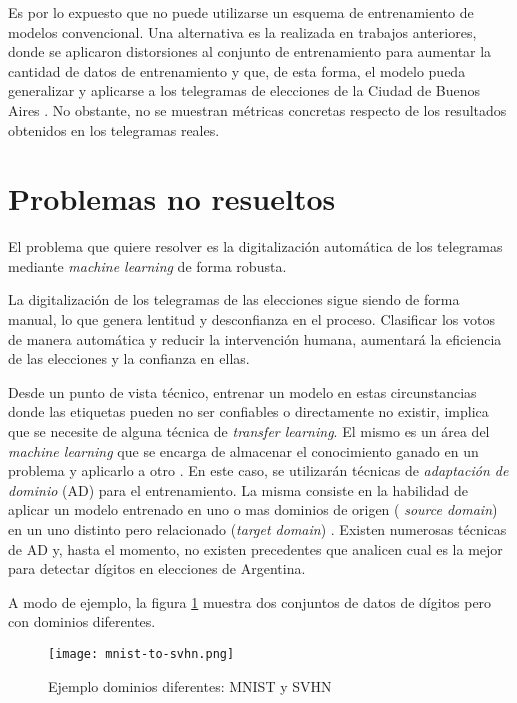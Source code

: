 \documentclass[a4paper, twoside, spanish]{report}
\begin{document}
Es por lo expuesto que no puede utilizarse un esquema de entrenamiento de modelos convencional. Una alternativa es la
realizada en trabajos anteriores, donde se aplicaron distorsiones al conjunto de entrenamiento para aumentar la
cantidad de datos de entrenamiento y que, de esta forma, el modelo pueda generalizar y aplicarse a los telegramas de
elecciones de la Ciudad de Buenos Aires \parencite{lamagna2016lectura}. No obstante, no se muestran m\'etricas concretas respecto de los resultados obtenidos en
los telegramas reales.

\section*{Problemas no resueltos}

El problema que quiere resolver es la digitalizaci\'on autom\'atica de los telegramas mediante {\it machine learning}
de forma robusta.

La digitalizaci\'on de los telegramas de las elecciones sigue siendo de forma manual, lo que genera lentitud y
desconfianza en el proceso. Clasificar los votos de manera autom\'atica y reducir la intervenci\'on humana, aumentar\'a
la eficiencia de las elecciones y la confianza en ellas.

Desde un punto de vista t\'ecnico, entrenar un modelo en estas circunstancias donde las etiquetas pueden no ser
confiables o directamente no existir, implica que se necesite de alguna t\'ecnica de {\it transfer learning}. El mismo
es un \'area del {\it machine learning} que se encarga de almacenar el conocimiento ganado en un problema y aplicarlo a
otro \parencite{thrun1998learning}. En este caso, se utilizar\'an t\'ecnicas de {\it adaptaci\'on de dominio} (AD) para el
entrenamiento. La misma consiste en la habilidad de aplicar un modelo entrenado en uno o mas dominios de origen ({\it
		source domain}) en un uno distinto pero relacionado ({\it target domain}) \parencite{ben2006analysis}. Existen numerosas t\'ecnicas de AD y, hasta el momento, no existen precedentes que analicen
cual es la mejor para detectar d\'igitos en elecciones de Argentina.

A modo de ejemplo, la figura \ref{fig:mnist-to-svhn} muestra dos conjuntos de datos de d\'igitos pero con dominios
diferentes.

\begin{figure}[ht]
	\centering
	\texttt{[image: mnist-to-svhn.png]}
	\caption{Ejemplo dominios diferentes: MNIST y SVHN}
	\label{fig:mnist-to-svhn}
\end{figure}
\end{document}
